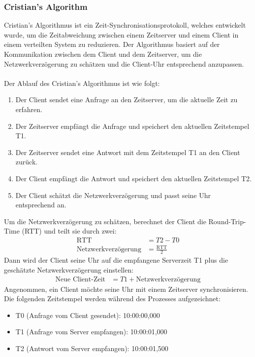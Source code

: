 \documentclass[../vs-script-first-v01.tex]{subfiles}
\begin{document}
\subsubsection{Cristian's Algorithm}
Cristian's Algorithmus ist ein Zeit-Synchronisationsprotokoll, welches entwickelt wurde, um die Zeitabweichung zwischen einem Zeitserver und einem Client in einem verteilten System zu reduzieren. Der Algorithmus basiert auf der Kommunikation zwischen dem Client und dem Zeitserver, um die Netzwerkverzögerung zu schätzen und die Client-Uhr entsprechend anzupassen.
\\\\
Der Ablauf des Cristian's Algorithmus ist wie folgt:
\begin{enumerate}
\item Der Client sendet eine Anfrage an den Zeitserver, um die aktuelle Zeit zu erfahren.
\item Der Zeitserver empfängt die Anfrage und speichert den aktuellen Zeitstempel T1.
\item Der Zeitserver sendet eine Antwort mit dem Zeitstempel T1 an den Client zurück.
\item Der Client empfängt die Antwort und speichert den aktuellen Zeitstempel T2.
\item Der Client schätzt die Netzwerkverzögerung und passt seine Uhr entsprechend an.
\end{enumerate}
Um die Netzwerkverzögerung zu schätzen, berechnet der Client die Round-Trip-Time (RTT) und teilt sie durch zwei:
\begin{align*}
\text{RTT} &= T2 - T0 \\
\text{Netzwerkverzögerung} &= \frac{\text{RTT}}{2}
\end{align*}
Dann wird der Client seine Uhr auf die empfangene Serverzeit T1 plus die geschätzte Netzwerkverzögerung einstellen:
\begin{align*}
\text{Neue Client-Zeit} &= T1 + \text{Netzwerkverzögerung}
\end{align*}
Angenommen, ein Client möchte seine Uhr mit einem Zeitserver synchronisieren. Die folgenden Zeitstempel werden während des Prozesses aufgezeichnet:
\begin{itemize}
\item T0 (Anfrage vom Client gesendet): 10:00:00,000
\item T1 (Anfrage vom Server empfangen): 10:00:01,000
\item T2 (Antwort vom Server empfangen): 10:00:01,500
\end{itemize}
\end{document}
